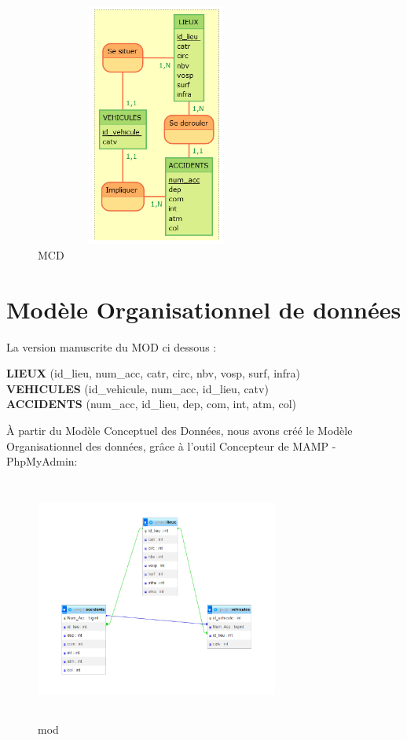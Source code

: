 \documentclass[mstat,12pt]{unswthesis}
\begin{document}
\begin{figure}
\hypertarget{mcd}{%
\centering
\includegraphics[width=8cm,height=8cm]{Images/MCD.png}
\caption{MCD}\label{mcd}
}
\end{figure}

\justify

\bigskip

\hypertarget{moduxe8le-organisationnel-de-donnuxe9es}{%
\section{Modèle Organisationnel de
données}\label{moduxe8le-organisationnel-de-donnuxe9es}}

\medskip

La version manuscrite du MOD ci dessous :

\textbf{LIEUX} (id\_lieu, num\_acc, catr, circ, nbv, vosp, surf,
infra)\\
\textbf{VEHICULES} (id\_vehicule, num\_acc, id\_lieu, catv)\\
\textbf{ACCIDENTS} (num\_acc, id\_lieu, dep, com, int, atm, col)

\medskip

À partir du Modèle Conceptuel des Données, nous avons créé le Modèle
Organisationnel des données, grâce à l'outil Concepteur de MAMP -
PhpMyAdmin:\\
\medskip

\begin{figure}
\hypertarget{mod}{%
\centering
\includegraphics[width=8cm,height=8cm]{Images/MOD.png}
\caption{mod}\label{mod}
}
\end{figure}
\end{document}

